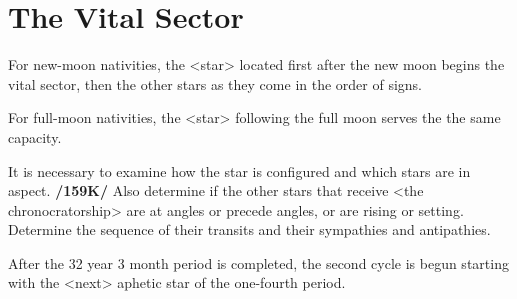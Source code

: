 \section{The Vital Sector}
For new-moon nativities, the <star> located first after the new moon begins the vital sector, then the other stars as they come in the order of signs. 

For full-moon nativities, the <star> following the full moon
serves the the same capacity. 

It is necessary to examine how the star is configured and which stars are in aspect. \textbf{/159K/} Also determine if the other stars that receive <the chronocratorship> are at angles or precede angles, or are rising or setting. Determine the sequence of their transits and their sympathies and antipathies. 

After the 32 year 3 month period is completed, the second cycle is begun starting with the <next> aphetic star of the one-fourth period.

\newpage
